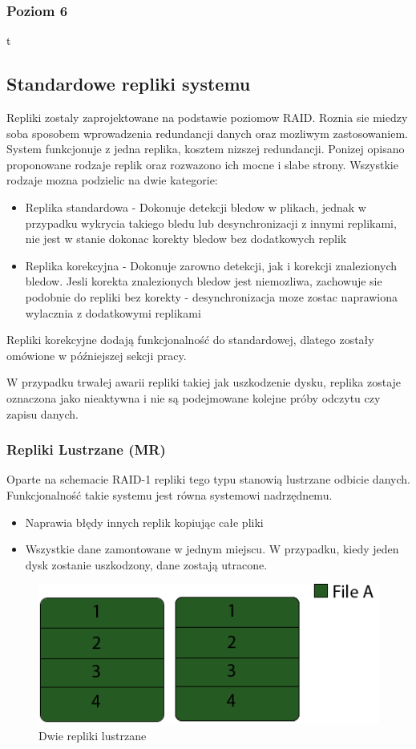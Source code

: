 \subsubsection{Poziom 6}
t
\newpage
\subsection{Standardowe repliki systemu}
Repliki zostaly zaprojektowane na podstawie poziomow RAID. Roznia sie miedzy soba sposobem wprowadzenia redundancji danych oraz mozliwym zastosowaniem. System funkcjonuje z jedna replika, kosztem nizszej redundancji. Ponizej opisano proponowane rodzaje replik oraz rozwazono ich mocne i slabe strony. Wszystkie rodzaje mozna podzielic na dwie kategorie:
\begin{itemize}
    \item Replika standardowa - Dokonuje detekcji bledow w plikach, jednak w przypadku wykrycia takiego bledu lub desynchronizacji z innymi replikami, nie jest w stanie dokonac korekty bledow bez dodatkowych replik
    \item Replika korekcyjna - Dokonuje zarowno detekcji, jak i korekcji znalezionych bledow. Jesli korekta znalezionych bledow jest niemozliwa, zachowuje sie podobnie do repliki bez korekty - desynchronizacja moze zostac naprawiona wylacznia z dodatkowymi replikami
\end{itemize}
Repliki korekcyjne dodają funkcjonalność do standardowej, dlatego zostały omówione w późniejszej sekcji pracy. 

W przypadku trwałej awarii repliki takiej jak uszkodzenie dysku, replika zostaje oznaczona jako nieaktywna i nie są podejmowane kolejne próby odczytu czy zapisu danych.
\subsubsection{Repliki Lustrzane (MR)}
Oparte na schemacie RAID-1 repliki tego typu stanowią lustrzane odbicie danych. Funkcjonalność takie systemu jest równa systemowi nadrzędnemu. 
\begin{itemize}
        \item Naprawia błędy innych replik kopiując całe pliki
        \item Wszystkie dane zamontowane w jednym miejscu. W przypadku, kiedy jeden dysk zostanie uszkodzony, dane zostają utracone.
\end{itemize}

\begin{figure}[h!]
        \centering
        \includegraphics{raid-1.png}
        \caption{Dwie repliki lustrzane}
        \label{fig:raid1}
\end{figure}

